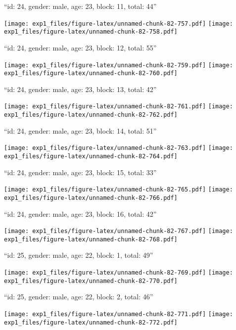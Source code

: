 \documentclass[11pt,,]{article}
\begin{document}
\newpage
[1] 

``id: 24, gender: male, age: 23, block: 11, total: 44''

\texttt{[image: exp1\_files/figure-latex/unnamed-chunk-82-757.pdf]}
\texttt{[image: exp1\_files/figure-latex/unnamed-chunk-82-758.pdf]}

\newpage
[1] 

``id: 24, gender: male, age: 23, block: 12, total: 55''

\texttt{[image: exp1\_files/figure-latex/unnamed-chunk-82-759.pdf]}
\texttt{[image: exp1\_files/figure-latex/unnamed-chunk-82-760.pdf]}

\newpage
[1] 

``id: 24, gender: male, age: 23, block: 13, total: 42''

\texttt{[image: exp1\_files/figure-latex/unnamed-chunk-82-761.pdf]}
\texttt{[image: exp1\_files/figure-latex/unnamed-chunk-82-762.pdf]}

\newpage
[1] 

``id: 24, gender: male, age: 23, block: 14, total: 51''

\texttt{[image: exp1\_files/figure-latex/unnamed-chunk-82-763.pdf]}
\texttt{[image: exp1\_files/figure-latex/unnamed-chunk-82-764.pdf]}

\newpage
[1] 

``id: 24, gender: male, age: 23, block: 15, total: 33''

\texttt{[image: exp1\_files/figure-latex/unnamed-chunk-82-765.pdf]}
\texttt{[image: exp1\_files/figure-latex/unnamed-chunk-82-766.pdf]}

\newpage
[1] 

``id: 24, gender: male, age: 23, block: 16, total: 42''

\texttt{[image: exp1\_files/figure-latex/unnamed-chunk-82-767.pdf]}
\texttt{[image: exp1\_files/figure-latex/unnamed-chunk-82-768.pdf]}

\newpage
[1] 

``id: 25, gender: male, age: 22, block: 1, total: 49''

\texttt{[image: exp1\_files/figure-latex/unnamed-chunk-82-769.pdf]}
\texttt{[image: exp1\_files/figure-latex/unnamed-chunk-82-770.pdf]}

\newpage
[1] 

``id: 25, gender: male, age: 22, block: 2, total: 46''

\texttt{[image: exp1\_files/figure-latex/unnamed-chunk-82-771.pdf]}
\texttt{[image: exp1\_files/figure-latex/unnamed-chunk-82-772.pdf]}
\end{document}
